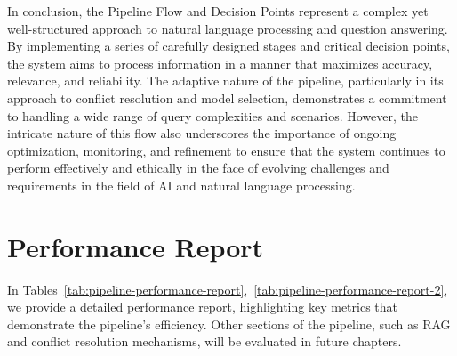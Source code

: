 In conclusion, the Pipeline Flow and Decision Points represent a complex yet well-structured approach to natural language processing and question answering.
By implementing a series of carefully designed stages and critical decision points, the system aims to process information in a manner that maximizes accuracy, relevance, and reliability.
The adaptive nature of the pipeline, particularly in its approach to conflict resolution and model selection, demonstrates a commitment to handling a wide range of query complexities and scenarios.
However, the intricate nature of this flow also underscores the importance of ongoing optimization, monitoring, and refinement to ensure that the system continues to perform effectively and ethically in the face of evolving challenges and requirements in the field of AI and natural language processing.
\section{Performance Report}\label{sec:performance-report}
In Tables~\ref{tab:pipeline-performance-report},~\ref{tab:pipeline-performance-report-2}, we provide a detailed performance report, highlighting key metrics that demonstrate the pipeline's efficiency.
Other sections of the pipeline, such as RAG and conflict resolution mechanisms, will be evaluated in future chapters.
\begin{table}[ht!]
    \noindent
    \caption{Performance of our LLM applications in production, generated by Openlit~\footnote{\url{https://openlit.io/}} with \textit{Gemma2} model.}
    \label{tab:pipeline-performance-report}
\end{table}

